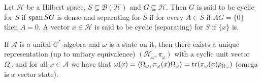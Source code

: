 \begin{definition}
Let $\mathcal{H}$ be a Hilbert space, $S\subseteq\mathcal{B}(\mathcal{H})$ and $G\subseteq\mathcal{H}$. Then $G$ is said to be cyclic for $S$ if $\operatorname{span} SG$ is dense and separating for $S$ if for every $A\in S$ if $AG=\{0\}$ then $A=0$. A vector $x\in\mathcal{H}$ is said to be cyclic (separating) for $S$ if $\{x\}$ is.
\end{definition}

\begin{theorem}
If $\mathcal{A}$ is a unital $C^*$-algebra and $\omega$ is a state on it, then there exists a unique representation (up to unitary equivalence) $(\mathcal{H}_\omega,\pi_\omega)$ with a cyclic unit vector $\Omega_\omega$ and for all $x\in\mathcal{A}$ we have that $\omega(x)=\langle\Omega_\omega,\pi_\omega(x)\Omega_\omega\rangle=\operatorname{tr}(\pi_\omega(x)\rho_{\Omega_\omega})$ (omega is a vector state).  
\end{theorem}

